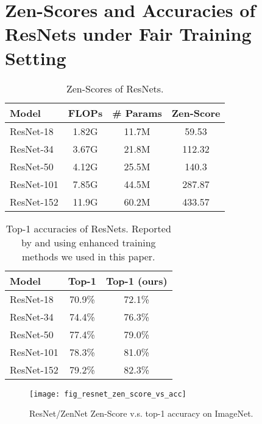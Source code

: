 \documentclass{article}
\providecommand{\tabularnewline}{\\}
\providecommand{\citep}{\cite}
\providecommand{\tabularnewline}{\\}
\begin{document}
\section{Zen-Scores and Accuracies of ResNets under Fair Training Setting}
\label{sec:zen-score-accuracy-of-resnets-under-fair-training}

\begin{table} [!h]
  \begin{center}
    \begin{tabular}{lccc}
      \toprule 
      Model & FLOPs & \# Params & Zen-Score\tabularnewline
      \midrule
      \midrule 
      ResNet-18 & 1.82G & 11.7M & 59.53\tabularnewline
      \midrule 
      ResNet-34 & 3.67G & 21.8M & 112.32\tabularnewline
      \midrule 
      ResNet-50 & 4.12G & 25.5M & 140.3\tabularnewline
      \midrule 
      ResNet-101 & 7.85G & 44.5M & 287.87\tabularnewline
      \midrule 
      ResNet-152 & 11.9G & 60.2M & 433.57\tabularnewline
      \bottomrule
    \end{tabular}    
  \end{center}  
  \caption{Zen-Scores of ResNets.}
  \label{tab:zen-score-of-resnets}
\end{table}

\begin{table} [!h]
  \begin{center}
    \begin{tabular}{lcc}
      \toprule 
      Model & Top-1 \citep{heDeepResidualLearning2016} & Top-1 (ours)\tabularnewline
      \midrule
      \midrule 
      ResNet-18 & 70.9\% & 72.1\%\tabularnewline
      \midrule 
      ResNet-34 & 74.4\% & 76.3\%\tabularnewline
      \midrule 
      ResNet-50 & 77.4\% & 79.0\%\tabularnewline
      \midrule 
      ResNet-101 & 78.3\% & 81.0\%\tabularnewline
      \midrule 
      ResNet-152 & 79.2\% & 82.3\%\tabularnewline
      \bottomrule
      \end{tabular}
  \end{center}  
  \caption{Top-1 accuracies of ResNets. Reported by \citep{heDeepResidualLearning2016} and using enhanced training methods we used in this paper.}
  \label{tab:top-1-resnets-he-vs-ours}
\end{table}

\begin{figure}[!h]
  \begin{center}
    \texttt{[image: fig\_resnet\_zen\_score\_vs\_acc]}    
  \end{center}
  \caption{ResNet/ZenNet Zen-Score v.s. top-1 accuracy on ImageNet.}
  \label{fig:resnet-zen-score-vs-acc}
\end{figure}
\end{document}
